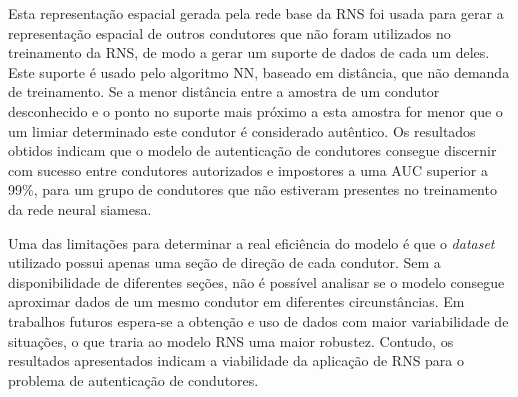 \documentclass[conference,harvard,brazil,english]{sbatex}
\begin{document}
Esta representação espacial gerada pela rede base da RNS foi usada para gerar a representação espacial de outros condutores que não foram utilizados no treinamento da RNS, de modo a gerar um suporte de dados de cada um deles. Este suporte é usado pelo algoritmo NN, baseado em distância, que não demanda de treinamento. Se a menor distância entre a amostra de um condutor desconhecido e o ponto no suporte mais próximo a esta amostra for menor que o um limiar determinado este condutor é considerado autêntico. Os resultados obtidos indicam que o modelo de autenticação de condutores consegue discernir com sucesso entre condutores autorizados e impostores a uma AUC superior a 99\%, para um grupo de condutores que não estiveram presentes no treinamento da rede neural siamesa.

Uma das limitações para determinar a real eficiência do modelo é que o \textit{dataset} utilizado possui apenas uma seção de direção de cada condutor. Sem a disponibilidade de diferentes seções, não é possível analisar se o modelo consegue aproximar dados de um mesmo condutor em diferentes circunstâncias. Em trabalhos futuros espera-se a obtenção e uso de dados com maior variabilidade de situações, o que traria ao modelo RNS uma maior robustez. Contudo, os resultados apresentados indicam a viabilidade da aplicação de RNS para o problema de autenticação de condutores.


\end{document}
